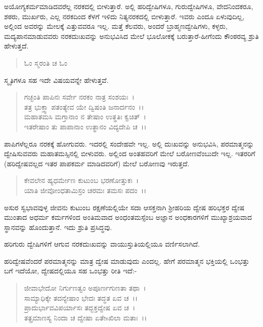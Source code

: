ಅಯೋಗ್ಯಕರ್ಮಮಾಡಿದವರೆಲ್ಲ ನರಕದಲ್ಲಿ ಬೀಳುತ್ತಾರೆ. ಅಲ್ಲಿ ಹರಿದ್ವೇಷಿಗಳೂ, ಗುರುದ್ವೇಷಿಗಳೂ, ವೇದನಿಂದಕರೂ, ಶಠರು, ಮುರ್ಖರು, ಎಲ್ಲ ನರಕದಿಂದ ಕೆಳಗೆ ಇಳಿದು ನಿತ್ಯನರಕದಲ್ಲಿ ಬೀಳುತ್ತಾರೆ. ಇವರು ಎಂದೂ ಏಳುವುದಿಲ್ಲ, ಅಲ್ಲಿಂದ ಅವರನ್ನು ಮೇಲಕ್ಕೆ ಎತ್ತುವವರೂ ಇಲ್ಲ. ಮತ್ತೆ ಕೆಲವರು, ಅಂದರೆ ಬ್ರಾಹ್ಮಣದ್ವೇಷಿಗಳು, ಕಳ್ಳರು, ಮದ್ಯಪಾನಮಾಡುವವರು ನರಕದುಃಖವನ್ನು ಅನುಭವಿಸಿದ ಮೇಲೆ ಭೂಲೋಕಕ್ಕೆ ಬರುತ್ತಾರೆ-ಹೀಗೆಂದು ಕೌಂಠರವ್ಯ ಶ್ರುತಿ ಹೇಳುತ್ತದೆ.

\begin{verse}
ಓಂ ಸ್ಮರಂತಿ ಚ ಓಂ
\end{verse}

ಸ್ಮೃತಿಗಳೂ ಸಹ ಇದೇ ವಿಷಯವನ್ನೇ ಹೇಳುತ್ತವೆ.

\begin{verse}
ಗಚ್ಛಂತಿ ಪಾಪಿನಃ ಸರ್ವೇ ನರಕಂ ನಾತ್ರ ಸಂಶಯಃ~।\\ ತತ್ರ ಭುಕ್ತ್ವಾ ಪತಂತ್ಯೇವ ಯೇ ದ್ವಿಷಂತಿ ಜನಾರ್ದನಂ~।।\\ ಮಹಾತಮಸಿ ಮಗ್ತಾನಾಂ ನ ತೇಷಾಂ ಉತ್ಥತಿಃ ಕ್ವಚಿತ್~।\\ ಇತರೇಷಾಂ ತು ಪಾಪಾನಾಂ ಉತ್ಥಾನಂ ವಿದ್ಯದೇಪಿ ಚ~।।
\end{verse}

ಪಾಪಿಗಳೆಲ್ಲರೂ ನರಕಕ್ಕೆ ಹೋಗುವರು. ಇದರಲ್ಲಿ ಸಂದೇಹವೇ ಇಲ್ಲ. ಅಲ್ಲಿ ದುಃಖವನ್ನು ಅನುಭವಿಸಿ, ಪರಮಾತ್ಮನನ್ನು ದ್ವೇಷಿಸುವವರು ಮಹಾತಮಸ್ಸಿನಲ್ಲಿ ಬೀಳುವರು. ಅಲ್ಲಿಂದ ಅಂತಹವರಿಗೆ ಮೇಲೆ ಬರೋಣವೆಂಬುದೇ ಇಲ್ಲ. ಇತರರಿಗೆ (ಹರಿದ್ವೇಷವಲ್ಲದ ಇತರ ಪಾಪಕರ್ಮ ಮಾಡಿದವರಿಗೆ) ಮೇಲೆ ಬರೋಣವು ಇರುತ್ತದೆ.

\begin{verse}
ಕೇವಲೇನ ಹ್ಯಧರ್ಮೇಣ ಕುಟುಂಬ ಭರಣೋತ್ತುಕಃ~।\\ ಯಾತಿ ಜೀವೋಂಧತಾಮಿಸ್ರಂ ಚರಮಃ ತಮಸಃ ಪದಂ~।।
\end{verse}


ಅಸುರ ಸ್ವಭಾವವುಳ್ಳ ಜೀವನು ಕುಟುಂಬ ರಕ್ಷಣೆಯಲ್ಲಿಯೇ ಸದಾ ಆಸಕ್ತನಾಗಿ ಶ‍್ರೀಹರಿಯ ದ್ವೇಷ ಹರಿಭಕ್ತರ ದ್ವೇಷ ಮುಂತಾದ ಅಧರ್ಮ ಕರ್ಮಗಳಿಂದ ಅಂತಿಮವಾದ ಅಂಧಂತಮಸ್ಸೆಂಬ ಅಜ್ಞಾನ ಅಂಧಕಾರಗಳಿಗೆ ಮುಖ್ಯಾಶ್ರಯವಾದ ಸ್ಥಾನವನ್ನು ಹೊಂದುತ್ತಾನೆ. ಇದು ಶ್ರುತಿ ಪ್ರಸಿದ್ಧವು.

ಹರಿಗುರು ದ್ವೇಷಿಗಳಿಗೆ ಆಗುವ ನರಕದುಃಖವನ್ನು ವಾಯುಸ್ತುತಿಯಲ್ಲಿಯೂ ವರ್ಣಿಸಲಾಗಿದೆ.

ಹರಿದ್ವೇಷವೆಂದರೆ ಪರಮಾತ್ಮನನ್ನು ಮಾತ್ರ ದ್ವೇಷ ಮಾಡುವುದು ಎಂದಲ್ಲ. ಹೇಗೆ ಪರಮಾತ್ಮನ ಭಕ್ತಿಯಲ್ಲಿ ಒಂಭತ್ತು ಬಗೆ ಇದೆಯೋ, ದ್ವೇಷದಲ್ಲಿಯೂ ಸಹ ಒಂಭತ್ತು ರೀತಿ ಇದೆ:-

\begin{verse}
ಜೀವಾಭೇದೋ ನಿರ್ಗುಣತ್ವಂ ಅಪೂರ್ಣಗುಣತಾ ತಥಾ~।\\ ಸಾಮ್ಯಾಧಿಕ್ಕೇ ತದನ್ಯೇಷಾಂ ಭೇದಃ ತದ್ಧತ ಏವ ಚ~।।\\ ಪ್ರಾದುರ್ಭಾವವಿಪರ್ಯಾಸಃ ತದ್ಭಕ್ತದ್ವೇಷ ಏವ ಚ~।\\ ತತ್ಪ್ರಮಾಣಸ್ಯ ನಿಂದಾ ಚ ದ್ವೇಷಾ ಏತೇsಖಿಲಾ ಮತಾಃ~।।
\end{verse}


